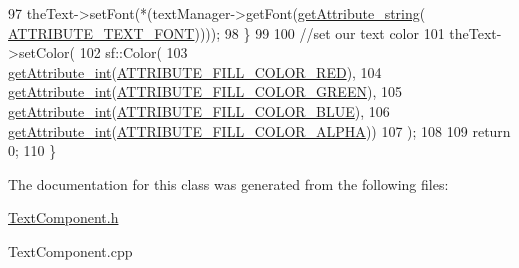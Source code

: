 \begin{DoxyCode}
97         theText->setFont(*(textManager->getFont(\hyperlink{class_abstract_component_a4140957094ef40c4ffaa0ef381d00ce5}{getAttribute\_string}(
      \hyperlink{_a_e___attributes_8h_a13b5d39e16142e79a137e0377f0f56cf}{ATTRIBUTE\_TEXT\_FONT}))));
98     \}
99 
100     \textcolor{comment}{//set our text color}
101     theText->setColor(
102         sf::Color(
103             \hyperlink{class_abstract_component_a16ac644f742683149b78d01b787eb3bd}{getAttribute\_int}(\hyperlink{_a_e___attributes_8h_a3725edfd1b846140eb49aa34b027b2cb}{ATTRIBUTE\_FILL\_COLOR\_RED}),
104             \hyperlink{class_abstract_component_a16ac644f742683149b78d01b787eb3bd}{getAttribute\_int}(\hyperlink{_a_e___attributes_8h_a44093150b0166936e44f0748babd201c}{ATTRIBUTE\_FILL\_COLOR\_GREEN}),
105             \hyperlink{class_abstract_component_a16ac644f742683149b78d01b787eb3bd}{getAttribute\_int}(\hyperlink{_a_e___attributes_8h_a7c1ee03e64d7b6dd251b709f0130cc62}{ATTRIBUTE\_FILL\_COLOR\_BLUE}),
106             \hyperlink{class_abstract_component_a16ac644f742683149b78d01b787eb3bd}{getAttribute\_int}(\hyperlink{_a_e___attributes_8h_a66939dddc263c09ff273450168b31918}{ATTRIBUTE\_FILL\_COLOR\_ALPHA}))
107     );
108 
109     \textcolor{keywordflow}{return} 0;
110 \}\end{DoxyCode}


The documentation for this class was generated from the following files\-:\begin{DoxyCompactItemize}
\item 
\hyperlink{_text_component_8h}{Text\-Component.\-h}\item 
Text\-Component.\-cpp\end{DoxyCompactItemize}
